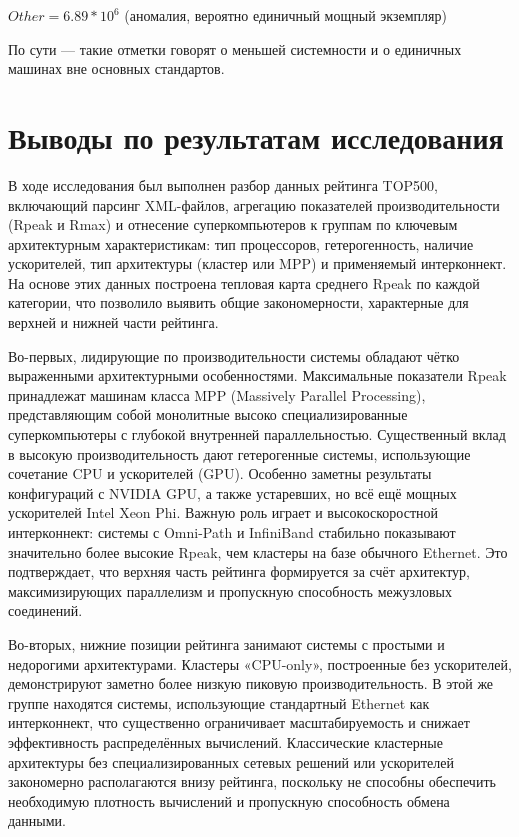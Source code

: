 \documentclass[14pt,a4paper]{extarticle}
\begin{document}
$Other = 6.89*10^6$ (аномалия, вероятно единичный мощный экземпляр)

По сути — такие отметки говорят о меньшей системности и о единичных машинах вне основных стандартов.

\section{Выводы по результатам исследования}
В ходе исследования был выполнен разбор данных рейтинга TOP500, включающий
парсинг XML-файлов, агрегацию показателей производительности (Rpeak и Rmax) и
отнесение суперкомпьютеров к группам по ключевым архитектурным характеристикам:
тип процессоров, гетерогенность, наличие ускорителей, тип архитектуры (кластер
или MPP) и применяемый интерконнект. На основе этих данных построена тепловая
карта среднего Rpeak по каждой категории, что позволило выявить общие
закономерности, характерные для верхней и нижней части рейтинга.

Во-первых, лидирующие по производительности системы обладают чётко выраженными
архитектурными особенностями. Максимальные показатели Rpeak принадлежат машинам
класса MPP (Massively Parallel Processing), представляющим собой монолитные
высоко специализированные суперкомпьютеры с глубокой внутренней
параллельностью. Существенный вклад в высокую производительность дают
гетерогенные системы, использующие сочетание CPU и ускорителей (GPU). Особенно
заметны результаты конфигураций с NVIDIA GPU, а также устаревших, но всё ещё
мощных ускорителей Intel Xeon Phi. Важную роль играет и высокоскоростной
интерконнект: системы с Omni-Path и InfiniBand стабильно показывают значительно
более высокие Rpeak, чем кластеры на базе обычного Ethernet. Это подтверждает,
что верхняя часть рейтинга формируется за счёт архитектур, максимизирующих
параллелизм и пропускную способность межузловых соединений.

Во-вторых, нижние позиции рейтинга занимают системы с простыми и недорогими
архитектурами. Кластеры «CPU-only», построенные без ускорителей, демонстрируют
заметно более низкую пиковую производительность. В этой же группе находятся
системы, использующие стандартный Ethernet как интерконнект, что существенно
ограничивает масштабируемость и снижает эффективность распределённых
вычислений. Классические кластерные архитектуры без специализированных сетевых
решений или ускорителей закономерно располагаются внизу рейтинга, поскольку не
способны обеспечить необходимую плотность вычислений и пропускную способность
обмена данными.
\end{document}
